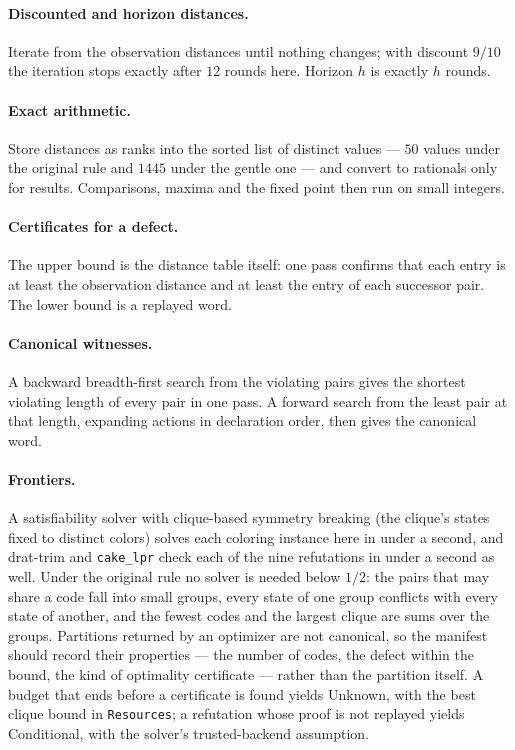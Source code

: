 \documentclass[11pt]{article}
\newcommand{\code}[1]{\texttt{#1}}
\theoremstyle{definition}
\theoremstyle{plain}
\begin{document}
\paragraph{Discounted and horizon distances.} Iterate from the observation distances until nothing
changes; with discount $9/10$ the iteration stops exactly after $12$ rounds here. Horizon $h$ is
exactly $h$ rounds.

\paragraph{Exact arithmetic.} Store distances as ranks into the sorted list of distinct values ---
$50$ values under the original rule and $1445$ under the gentle one --- and convert to rationals only
for results. Comparisons, maxima and the fixed point then run on small integers.

\paragraph{Certificates for a defect.} The upper bound is the distance table itself: one pass
confirms that each entry is at least the observation distance and at least the entry of each
successor pair. The lower bound is a replayed word.

\paragraph{Canonical witnesses.} A backward breadth-first search from the violating pairs gives the
shortest violating length of every pair in one pass. A forward search from the least pair at that
length, expanding actions in declaration order, then gives the canonical word.

\paragraph{Frontiers.} A satisfiability solver with clique-based symmetry breaking (the clique's
states fixed to distinct colors) solves each coloring instance here in under a second, and drat-trim
and \code{cake\_lpr} check each of the nine refutations in under a second as well. Under the
original rule no solver is needed below $1/2$: the pairs that may share a code fall into small groups,
every state of one group conflicts with every state of another, and the fewest codes and the largest
clique are sums over the groups. Partitions returned by an optimizer are not canonical, so the
manifest should record their properties --- the number of codes, the defect within the bound, the
kind of optimality certificate --- rather than the partition itself. A budget that ends before a
certificate is found yields Unknown, with the best clique bound in \code{Resources}; a refutation
whose proof is not replayed yields Conditional, with the solver's trusted-backend assumption.
\end{document}

